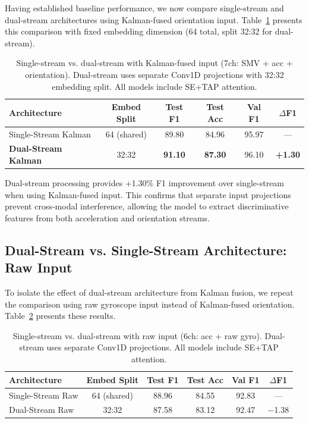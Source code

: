 Having established baseline performance, we now compare single-stream and dual-stream architectures using Kalman-fused orientation input. Table~\ref{tab:stream_kalman} presents this comparison with fixed embedding dimension (64 total, split 32:32 for dual-stream).

\begin{table}[H]
\caption{Single-stream vs. dual-stream with Kalman-fused input (7ch: SMV + acc + orientation). Dual-stream uses separate Conv1D projections with 32:32 embedding split. All models include SE+TAP attention.}
\label{tab:stream_kalman}
\centering
\begin{tabular}{lccccc}
\toprule
\textbf{Architecture} & \textbf{Embed Split} & \textbf{Test F1} & \textbf{Test Acc} & \textbf{Val F1} & \textbf{$\Delta$F1} \\
\midrule
Single-Stream Kalman & 64 (shared) & 89.80 & 84.96 & 95.97 & --- \\
\textbf{Dual-Stream Kalman} & 32:32 & \textbf{91.10} & \textbf{87.30} & 96.10 & \textbf{+1.30} \\
\bottomrule
\end{tabular}
\end{table}

Dual-stream processing provides +1.30\% F1 improvement over single-stream when using Kalman-fused input. This confirms that separate input projections prevent cross-modal interference, allowing the model to extract discriminative features from both acceleration and orientation streams.

\subsection{Dual-Stream vs. Single-Stream Architecture: Raw Input}
\label{subsec:stream_raw}

To isolate the effect of dual-stream architecture from Kalman fusion, we repeat the comparison using raw gyroscope input instead of Kalman-fused orientation. Table~\ref{tab:stream_raw} presents these results.

\begin{table}[H]
\caption{Single-stream vs. dual-stream with raw input (6ch: acc + raw gyro). Dual-stream uses separate Conv1D projections. All models include SE+TAP attention.}
\label{tab:stream_raw}
\centering
\begin{tabular}{lccccc}
\toprule
\textbf{Architecture} & \textbf{Embed Split} & \textbf{Test F1} & \textbf{Test Acc} & \textbf{Val F1} & \textbf{$\Delta$F1} \\
\midrule
Single-Stream Raw & 64 (shared) & 88.96 & 84.55 & 92.83 & --- \\
Dual-Stream Raw & 32:32 & 87.58 & 83.12 & 92.47 & $-$1.38 \\
\bottomrule
\end{tabular}
\end{table}

